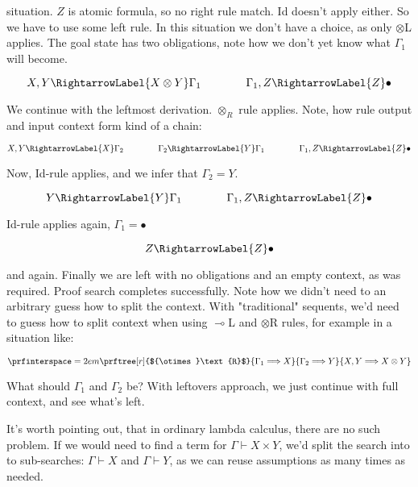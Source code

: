 \documentclass{article}
\begin{document}
situation. $Z$ is atomic formula, so no right rule match. {\sc Id} doesn't apply either.
So we have to use some left rule. In this situation we don't have a choice,
as only $\otimes$L applies. The goal state has two obligations, note how
we don't yet know what $\Gamma_1$ will become.

\begin{equation*}
X,Y \RightarrowLabel{X \otimes Y} \Gamma_1 \qquad\qquad \Gamma_1,Z \RightarrowLabel{Z} \bullet
\end{equation*}

We continue with the leftmost derivation. $\otimes_R$ rule applies. Note,
how rule output and input context form kind of a chain:

\begin{equation*}
X,Y \RightarrowLabel{X} \Gamma_2 \qquad\qquad \Gamma_2 \RightarrowLabel{Y} \Gamma_1 \qquad\qquad \Gamma_1,Z \RightarrowLabel{Z} \bullet
\end{equation*}

Now, {\sc Id}-rule applies, and we infer that $\Gamma_2 = Y$.

\begin{equation*}
Y \RightarrowLabel{Y} \Gamma_1 \qquad\qquad \Gamma_1,Z \RightarrowLabel{Z} \bullet
\end{equation*}

{\sc Id}-rule applies again, $\Gamma_1 = \bullet$

\begin{equation*}
Z \RightarrowLabel{Z} \bullet
\end{equation*}

and again. Finally we are left with no obligations and an empty context, as was required.
Proof search completes successfully. Note how we didn't need to an arbitrary guess
how to split the context. With "traditional" sequents, we'd need to guess how to split
context when using $\multimap$L and $\otimes$R rules, for example in a situation like:

\begin{equation*}
\prfinterspace=2em
\prftree[r]{${\otimes}\text{R}$}
{\Gamma_1 \Longrightarrow X}
{\Gamma_2 \Longrightarrow Y}
{X, Y \Longrightarrow X \otimes Y}
\end{equation*}

What should $\Gamma_1$ and $\Gamma_2$ be? With leftovers approach,
we just continue with full context, and see what's left.

It's worth pointing out, that in ordinary lambda calculus, there are no such
problem. If we would need to find a term for $\Gamma \vdash X \times Y$, we'd
split the search into to sub-searches: $\Gamma \vdash X$ and $\Gamma \vdash Y$,
as we can reuse assumptions as many times as needed.
\end{document}
